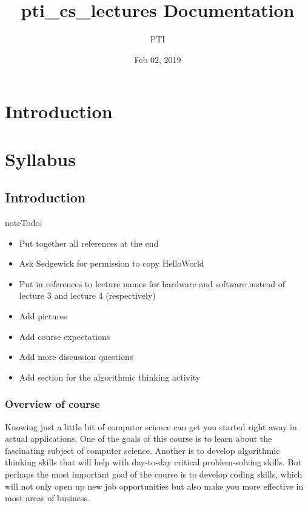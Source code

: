 \documentclass[letterpaper,10pt,english,openany,oneside]{sphinxmanual}
\title{pti\_cs\_lectures Documentation}
\date{Feb 02, 2019}
\author{PTI}
\begin{document}
\pagestyle{empty}
\sphinxmaketitle
\pagestyle{plain}
\sphinxtableofcontents
\pagestyle{normal}
\label{\detokenize{index::doc}}



\chapter{Introduction}
\label{\detokenize{index:introduction}}

\chapter{Syllabus}
\label{\detokenize{index:syllabus}}

\section{Introduction}
\label{\detokenize{introduction:introduction}}\label{\detokenize{introduction::doc}}
\begin{sphinxadmonition}{note}{\label{introduction:index-0}Todo:}\begin{itemize}
\item {} 
Put together all references at the end

\item {} 
Ask Sedgewick for permission to copy HelloWorld

\item {} 
Put in references to lecture names for hardware and software instead of lecture 3 and lecture 4 (respectively)

\item {} 
Add pictures

\item {} 
Add course expectations

\item {} 
Add more discussion questions

\item {} 
Add section for the algorithmic thinking activity

\end{itemize}
\end{sphinxadmonition}


\subsection{Overview of course}
\label{\detokenize{introduction:overview-of-course}}
Knowing just a little bit of computer science can get you started right away in actual applications. One of the goals of this course is to learn about the fascinating subject of computer science. Another is to develop algorithmic thinking skills that will help with day-to-day critical problem-solving skills. But perhaps the most important goal of the course is to develop coding skills, which will not only open up new job opportunities but also make you more effective in most areas of business.
\end{document}

